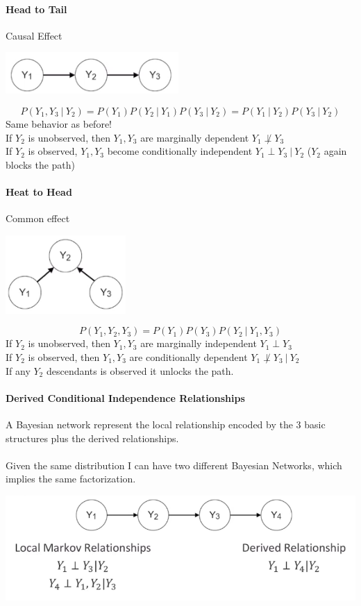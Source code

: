 \documentclass[10pt]{report}
\begin{document}
\paragraph{Head to Tail} Causal Effect \begin{center}
	\includegraphics[scale=0.75]{21.png}
\end{center}
$$P(Y_1,Y_3\:|\:Y_2)=P(Y_1)P(Y_2\:|\:Y_1)P(Y_3\:|\:Y_2)=P(Y_1\:|\:Y_2)P(Y_3\:|\:Y_2)$$
Same behavior as before!\\
If $Y_2$ is unobserved, then $Y_1,Y_3$ are marginally dependent $Y_1\not\perp Y_3$\\
If $Y_2$ is observed, $Y_1,Y_3$ become conditionally independent $Y_1\perp Y_3\:|\:Y_2$ ($Y_2$ again blocks the path)
\paragraph{Heat to Head} Common effect\begin{center}
	\includegraphics[scale=0.75]{22.png}
\end{center}
$$P(Y_1,Y_2,Y_3) = P(Y_1)P(Y_3)P(Y_2\:|\:Y_1,Y_3)$$
If $Y_2$ is unobserved, then $Y_1,Y_3$ are marginally independent $Y_1\perp Y_3$\\
If $Y_2$ is observed, then $Y_1,Y_3$ are conditionally dependent $Y_1\not\perp Y_3\:|\:Y_2$\\
If any $Y_2$ descendants is observed it unlocks the path.
\paragraph{Derived Conditional Independence Relationships} A Bayesian network represent the local relationship encoded by the 3 basic structures plus the derived relationships.\\\\
Given the same distribution I can have two different Bayesian Networks, which implies the same factorization.
\begin{center}
	\includegraphics[scale=0.5]{23.png}
\end{center}
\end{document}
